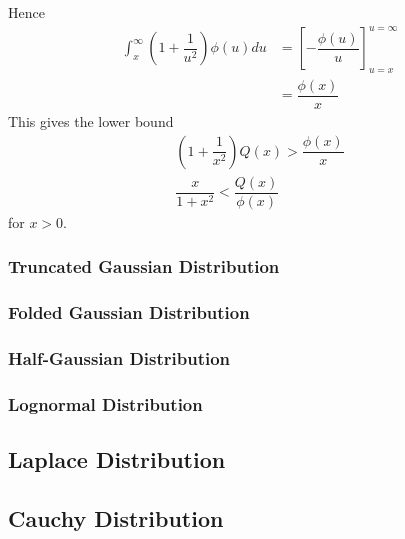 \documentclass[11pt]{report} %
\begin{document}
Hence
\begin{align}
\int_{x}^{\infty}\left(1 + \dfrac{1}{u^{2}}\right)\phi\left(u\right)du &= \left[-\dfrac{\phi\left(u\right)}{u}\right]_{u = x}^{u = \infty} \\
&= \dfrac{\phi\left(x\right)}{x}
\end{align}
This gives the lower bound
\begin{gather}
\left(1 + \dfrac{1}{x^{2}}\right)Q\left(x\right) > \dfrac{\phi\left(x\right)}{x} \\
\dfrac{x}{1 + x^{2}} < \dfrac{Q\left(x\right)}{\phi\left(x\right)}
\end{gather}
for $x > 0$.

\subsubsection{Truncated Gaussian Distribution}

\subsubsection{Folded Gaussian Distribution}

\subsubsection{Half-Gaussian Distribution}

\subsubsection{Lognormal Distribution}

\subsection{Laplace Distribution}

\subsection{Cauchy Distribution}
\end{document}
